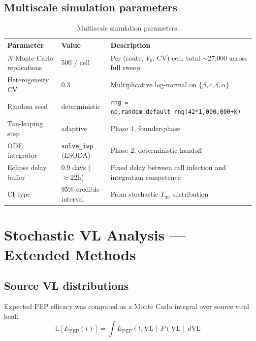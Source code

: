 \documentclass[11pt]{article}
\theoremstyle{definition}
\theoremstyle{remark}
\newcommand{\Tint}{T_{\text{int}}}
\newcommand{\Epep}{E_{\text{PEP}}}
\begin{document}
\subsection{Multiscale simulation parameters}

\begin{table}[H]
\centering
\small
\caption{Multiscale simulation parameters.}
\begin{tabular}{@{}lll@{}}
\toprule
\textbf{Parameter} & \textbf{Value} & \textbf{Description} \\
\midrule
$N$ Monte Carlo replications & 500 / cell & Per (route, $V_{0}$, CV) cell; total $\sim$27{,}000 across full sweep \\
Heterogeneity CV & 0.3 & Multiplicative log-normal on $\{\beta, c, \delta, \alpha\}$ \\
Random seed & deterministic & \texttt{rng = np.random.default\_rng(42*1{,}000{,}000+k)} \\
Tau-leaping step & adaptive & Phase 1, founder-phase \\
ODE integrator & \texttt{solve\_ivp} (LSODA) & Phase 2, deterministic handoff \\
Eclipse delay buffer & 0.9 days ($\approx 22$h) & Fixed delay between cell infection and integration competence \\
CI type & 95\% credible interval & From stochastic $\Tint$ distribution \\
\bottomrule
\end{tabular}
\end{table}


\section{Stochastic VL Analysis --- Extended Methods}

\subsection{Source VL distributions}

Expected PEP efficacy was computed as a Monte Carlo integral over source viral load:
\begin{equation}
\mathbb{E}[\Epep(t)] = \int \Epep(t, \text{VL})\,P(\text{VL})\,d\text{VL}
\label{eq:mc_integral}
\end{equation}
\end{document}
